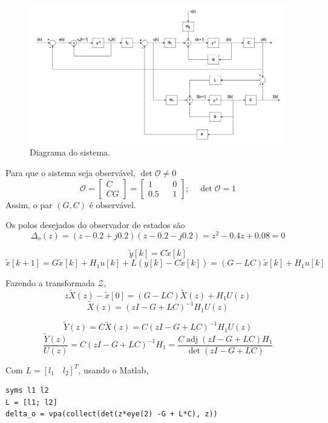 \documentclass{article}
\DeclareMathOperator\det{det}
\DeclareMathOperator\adj{adj}
\begin{document}
    \begin{figure}[H]
        \centering
        \includegraphics[width=1\linewidth]{images/diagram_q3.png}
        \caption{Diagrama do sistema.}\label{fig:diagram_q3}
    \end{figure}

    {Para que o sistema seja observável, $\det \mathscr{O} \ne 0$}
    \[ \mathscr{O} =
        \begin{bmatrix}
            C\\
            CG
        \end{bmatrix} =
        \begin{bmatrix}
            1 && 0\\
            0.5 && 1
        \end{bmatrix};\quad
        \det \mathscr{O} = 1
    \]
    {Assim, o par $(G, C)$ é observável.}

    {Os polos desejados do observador de estados são}
    \[ \Delta_o(z) = (z -0.2 +j0.2)(z-0.2 -j0.2) = z^2 -0.4z +0.08 = 0 \]

    \[ \tilde{y}[k] = C \tilde{x}[k] \]
    \[ \tilde{x}[k+1] = G\tilde{x}[k] + H_1u[k] + L(y[k] - C\tilde{x}[k]) =
        (G-LC)\tilde{x}[k] + H_1u[k]
    \]

    {Fazendo a transformada $\mathcal{Z}$,}
    \[ z\tilde{X}(z) - \tilde{x}[0] = (G-LC)\tilde{X}(z) + H_1U(z) \]
    \[ \tilde{X}(z) = (zI -G +LC)^{-1}H_1U(z) \]

    \[ \tilde{Y}(z) = C\tilde{X}(z) = C(zI -G +LC)^{-1}H_1U(z) \]
    \[ \frac{\tilde{Y}(z)}{U(z)} = C(zI -G +LC)^{-1}H_1
        = \frac{C \adj(zI -G +LC)H_1}{\det(zI -G +LC)}
    \]

    {Com $L = [l_1\quad l_2]^T$, usando o Matlab,}
    \begin{lstlisting}
syms l1 l2
L = [l1; l2]
delta_o = vpa(collect(det(z*eye(2) -G + L*C), z))
    \end{lstlisting}
\end{document}
